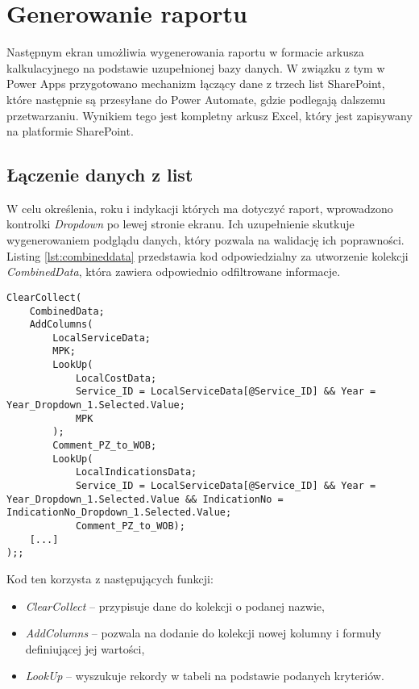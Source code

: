 \section{Generowanie raportu}

Następnym ekran umożliwia wygenerowania raportu w formacie arkusza kalkulacyjnego na podstawie uzupełnionej bazy danych. W związku z tym w Power Apps przygotowano mechanizm łączący dane z trzech list SharePoint, które następnie są przesyłane do Power Automate, gdzie podlegają dalszemu przetwarzaniu. Wynikiem tego jest kompletny arkusz Excel, który jest zapisywany na platformie SharePoint.

\subsection{Łączenie danych z list}

W celu określenia, roku i indykacji których ma dotyczyć raport, wprowadzono kontrolki \emph{Dropdown} po lewej stronie ekranu. Ich uzupełnienie skutkuje wygenerowaniem podglądu danych, który pozwala na walidację ich poprawności. Listing \ref{lst:combineddata} przedstawia kod odpowiedzialny za utworzenie kolekcji \emph{CombinedData}, która zawiera odpowiednio odfiltrowane informacje.



\begin{lstlisting}[language=PowerFx, caption={Fragment kodu tworzącego kolekcję CombinedData}, label={lst:combineddata}] 
    ClearCollect(
    CombinedData;
    AddColumns(
        LocalServiceData;
        MPK;
        LookUp(
            LocalCostData;
            Service_ID = LocalServiceData[@Service_ID] && Year = Year_Dropdown_1.Selected.Value;
            MPK
        );
        Comment_PZ_to_WOB;
        LookUp(
            LocalIndicationsData;
            Service_ID = LocalServiceData[@Service_ID] && Year = Year_Dropdown_1.Selected.Value && IndicationNo = IndicationNo_Dropdown_1.Selected.Value;
            Comment_PZ_to_WOB);     
    [...]
);;

\end{lstlisting}

Kod ten korzysta z następujących funkcji:
\begin{itemize}
    \item \emph{ClearCollect} -- przypisuje dane do kolekcji o podanej nazwie,
    \item \emph{AddColumns} -- pozwala na dodanie do kolekcji nowej kolumny i formuły definiującej jej wartości,
    \item \emph{LookUp} -- wyszukuje rekordy w tabeli na podstawie podanych kryteriów.
\end{itemize}

